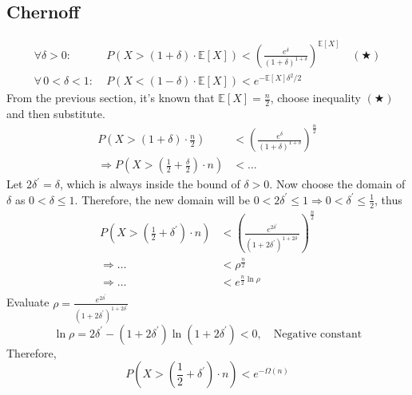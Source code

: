 \documentclass[a4paper, 12pt]{article}
\begin{document}
    \subsection{Chernoff}
        \begin{equation*}
            \begin{aligned}
                \forall \delta > 0:&\;
                P\!\left(X > (1+\delta)\cdot \mathbb{E}[X]\right)
                < \left( \frac{e^{\delta}}{(1+\delta)^{1+\delta}} \right)^{\mathbb{E}[X]}\quad(\bigstar)\\
                \forall\, 0 < \delta < 1:&\;
                P\!\left(X < (1-\delta)\cdot \mathbb{E}[X]\right)
                < e^{-\mathbb{E}[X]\delta^{2}/2}
            \end{aligned} 
        \end{equation*}
        From the previous section, it's known that $\mathbb{E}[X] = \frac{n}{2}$, choose inequality $(\bigstar)$  and then substitute.
        \begin{align*}
            P\left(X > (1 + \delta)\cdot\frac{n}{2}\right) &< \left(\frac{e^\delta}{(1+\delta)^{1+\delta}}\right)^{\frac{n}{2}}\\
            \Rightarrow P\left(X > \left(\frac{1}{2} + \frac{\delta}{2}\right)\cdot n\right) &< \ldots
        \end{align*}
        Let $2\delta^\prime = \delta$, which is always inside the bound of $\delta > 0$. Now choose the domain of $\delta$ as $0 < \delta \leq 1$. Therefore, the
        new domain will be $0<2\delta^\prime\leq1\Rightarrow0<\delta^\prime\leq\frac{1}{2}$, thus
        \begin{align*}
            P\left(X > \left(\frac{1}{2} + \delta^\prime\right)\cdot n\right) &< \left(\frac{e^{2\delta^\prime}}{(1+2\delta^\prime)^{1+2\delta^\prime}}\right)^{\frac{n}{2}}\\
            \Rightarrow \ldots &< \rho^{\frac{n}{2}}\\
            \Rightarrow \ldots &< e^{\frac{n}{2}\ln\rho}\\
        \end{align*}
        Evaluate $\rho = \frac{e^{2\delta^\prime}}{(1+2\delta^\prime)^{1+2\delta^\prime}}$
        \begin{equation*}
            \ln\rho = 2\delta^\prime - (1+2\delta^\prime)\ln (1+2\delta^\prime) < 0,\quad\text{Negative constant}
        \end{equation*}
        Therefore,
        \begin{equation*}
            P\left(X > \left(\frac{1}{2} + \delta^\prime\right)\cdot n\right) < e^{-\Omega(n)}
        \end{equation*}
\end{document}
